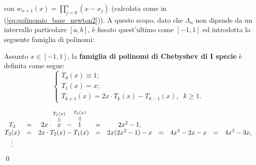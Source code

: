 
\noindent con $w_{n+1}(x)=\prod_{j=0}^n(x-x_j)$ (calcolata come in (\ref{eq:polinomio_base_newton2})). A questo scopo, dato che $\Lambda_n$ non dipende da un intervallo particolare $[a,b]$, è fissato quest'ultimo come $[-1,1]$ ed introdotta la seguente famiglia di polinomi:

\begin{definition}\label{def:polinomi_chebyshev_I_specie}
    Assunto $x\in [-1,1]$, la \textbf{famiglia di polinomi di Chebyshev di I specie} è definita come segue:
    \begin{equation}\label{eq:polinomi_chebyshev_I_specie}
        \begin{cases}
        T_0(x) \equiv 1;\\
        T_1(x) = x;\\
        T_{k+1}(x) = 2x\cdot T_k(x)-T_{k-1}(x),\;\; k\geq 1.
        \end{cases}
    \end{equation}
\end{definition}

\begin{example}
    \begin{equation*}
        \begin{matrix}
            T_2 &=& 2x \cdot \equaltoup{x}{T_1(x)} - \equaltoup{1}{T_0(x)} &=& 2x^2-1,\\
            T_3(x) &=& 2x\cdot T_2(x)-T_1(x)&=&2x(2x^2-1)-x&=& 4x^3-2x-x &=& 4x^3-3x,\\
            \vdots
        \end{matrix}
    \end{equation*}
    \qed
\end{example}

